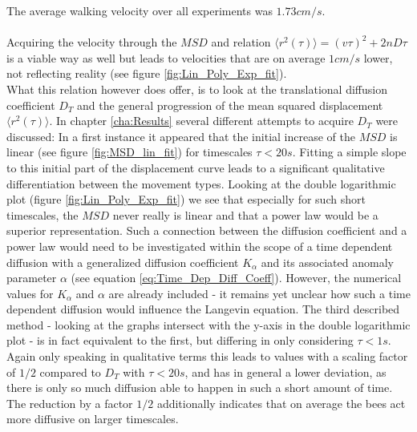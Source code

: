 The average walking velocity over all experiments was $1.73 cm/s$.
\\
\\
Acquiring the velocity through the $MSD$ and relation $\langle r^{2}(\tau)\rangle = (v \tau)^{2} + 2nD\tau$ is a viable way as well \cite{Cherstvy2021} \cite{Tseng2002} but leads to velocities that are on average $1cm/s$ lower, not reflecting reality (see figure \ref{fig:Lin_Poly_Exp_fit}).\\
What this relation however does offer, is to look at the translational diffusion coefficient $D_T$ and the general progression of the mean squared displacement $\langle r^{2}(\tau)\rangle$.
In chapter \ref{cha:Results} several different attempts to acquire $D_T$ were discussed:
In a first instance it appeared that the initial increase of the $MSD$ is linear (see figure \ref{fig:MSD_lin_fit}) for timescales $\tau < 20s$. Fitting a simple slope to this initial part of the displacement curve leads to a significant qualitative differentiation between the movement types.
Looking at the double logarithmic plot (figure \ref{fig:Lin_Poly_Exp_fit}) we see that especially for such short timescales, the $MSD$ never really is linear and that a power law would be a superior representation. Such a connection between the diffusion coefficient and a power law would need to be investigated within the scope of a time dependent diffusion with a generalized diffusion coefficient $K_{\alpha}$ and its associated anomaly parameter $\alpha$ (see equation \ref{eq:Time_Dep_Diff_Coeff}). However, the numerical values for $K_{\alpha}$ and $\alpha$ are already included - it remains yet unclear how such a time dependent diffusion would influence the Langevin equation.
The third described method - looking at the graphs intersect with the y-axis in the double logarithmic plot - is in fact equivalent to the first, but differing in only considering $\tau < 1s$. Again only speaking in qualitative terms this leads to values with a scaling factor of $1/2$ compared to $D_T$ with $\tau<20s$, and has in general a lower deviation, as there is only so much diffusion able to happen in such a short amount of time. The reduction by a factor $1/2$ additionally indicates that on average the bees act more diffusive on larger timescales.
\\
\\
